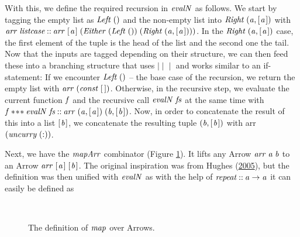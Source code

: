 \documentclass[paper=A4,twoside=true,openright,parskip=full,chapterprefix=true,headings=normal,bibliography=totoc,listof=totoc,titlepage=on,captions=tableabove,draft=false,british]{scrreprt}%
\begin{document}
With this, we define the required recursion in \ensuremath{\Varid{evalN}} as follows. We
start by tagging the empty list as \ensuremath{\Conid{Left}\;()} and the non-empty list into
\ensuremath{\Conid{Right}\;(\Varid{a},[\mskip1.5mu \Varid{a}\mskip1.5mu])} with
\ensuremath{\Varid{arr}\;\Varid{listcase}\mathbin{::}\Varid{arr}\;[\mskip1.5mu \Varid{a}\mskip1.5mu]\;(\Conid{Either}\;(\Conid{Left}\;())\;(\Conid{Right}\;(\Varid{a},[\mskip1.5mu \Varid{a}\mskip1.5mu])))}. In the
\ensuremath{\Conid{Right}\;(\Varid{a},[\mskip1.5mu \Varid{a}\mskip1.5mu])} case, the first element of the tuple is the head of the
list and the second one the tail. Now that the inputs are tagged
depending on their structure, we can then feed these into a branching
structure that uses \ensuremath{\mathbin{\mid\!\mid\!\mid}} and works similar to an if-statement:
If we encounter \ensuremath{\Conid{Left}\;()} -- the base case of the recursion, we return
the empty list with \ensuremath{\Varid{arr}\;(\Varid{const}\;[\mskip1.5mu \mskip1.5mu])}. Otherwise, in the recursive step,
we evaluate the current function \ensuremath{\Varid{f}} and the recursive call \ensuremath{\Varid{evalN}\;\Varid{fs}}
at the same time with \ensuremath{\Varid{f}\mathbin{*\!*\!*}\Varid{evalN}\;\Varid{fs}\mathbin{::}\Varid{arr}\;(\Varid{a},[\mskip1.5mu \Varid{a}\mskip1.5mu])\;(\Varid{b},[\mskip1.5mu \Varid{b}\mskip1.5mu])}. Now, in
order to concatenate the result of this into a list \ensuremath{[\mskip1.5mu \Varid{b}\mskip1.5mu]}, we
concatenate the resulting tuple \ensuremath{(\Varid{b},[\mskip1.5mu \Varid{b}\mskip1.5mu])} with arr \ensuremath{(\Varid{uncurry}\;(\mathbin{:}))}.

Next, we have the \ensuremath{\Varid{mapArr}} combinator (Figure \ref{fig:mapArr}). It
lifts any Arrow \ensuremath{\Varid{arr}\;\Varid{a}\;\Varid{b}} to an Arrow \ensuremath{\Varid{arr}\;[\mskip1.5mu \Varid{a}\mskip1.5mu]\;[\mskip1.5mu \Varid{b}\mskip1.5mu]}. The original
inspiration was from Hughes (\protect\hyperlink{ref-Hughes2005}{2005}),
but the definition was then unified with \ensuremath{\Varid{evalN}} as with the help of
\ensuremath{\Varid{repeat}\mathbin{::}\Varid{a}\to \Varid{a}} it can easily be defined as

\begin{figure}[h]
\centering
\begin{hscode}\SaveRestoreHook
{}%
%
\>[B]{}\mathbin{::}\;\Rightarrow {}\;\;\to {}\<[E]%
\\
\>[B]{}\mathrel{=}\mathbin{\circ}\<[E]%
\ColumnHook
\end{hscode}\resethooks
\caption{The definition of \ensuremath{\Varid{map}} over Arrows.}\label{fig:mapArr}\end{figure}
\end{document}
